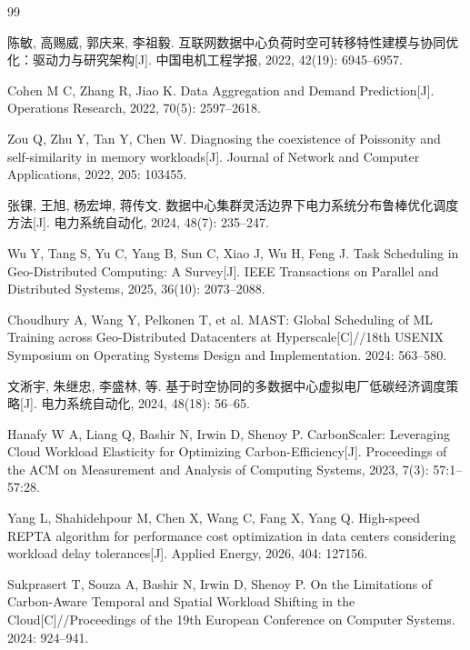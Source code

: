 \begingroup
\footnotesize
\setlength{\parskip}{0pt}
\begin{thebibliography}{99}
\setlength{\itemsep}{0.12ex}
\setlength{\parsep}{0pt}
\setlength{\topsep}{0.2ex}

陈敏, 高赐威, 郭庆来, 李祖毅. 互联网数据中心负荷时空可转移特性建模与协同优化：驱动力与研究架构[J]. 中国电机工程学报, 2022, 42(19): 6945--6957.

Cohen M C, Zhang R, Jiao K. Data Aggregation and Demand Prediction[J]. Operations Research, 2022, 70(5): 2597--2618.

Zou Q, Zhu Y, Tan Y, Chen W. Diagnosing the coexistence of Poissonity and self-similarity in memory workloads[J]. Journal of Network and Computer Applications, 2022, 205: 103455.

张锞, 王旭, 杨宏坤, 蒋传文. 数据中心集群灵活边界下电力系统分布鲁棒优化调度方法[J]. 电力系统自动化, 2024, 48(7): 235--247.

Wu Y, Tang S, Yu C, Yang B, Sun C, Xiao J, Wu H, Feng J. Task Scheduling in Geo-Distributed Computing: A Survey[J]. IEEE Transactions on Parallel and Distributed Systems, 2025, 36(10): 2073--2088.

Choudhury A, Wang Y, Pelkonen T, et al. MAST: Global Scheduling of ML Training across Geo-Distributed Datacenters at Hyperscale[C]//18th USENIX Symposium on Operating Systems Design and Implementation. 2024: 563--580.

文淅宇, 朱继忠, 李盛林, 等. 基于时空协同的多数据中心虚拟电厂低碳经济调度策略[J]. 电力系统自动化, 2024, 48(18): 56--65.

Hanafy W A, Liang Q, Bashir N, Irwin D, Shenoy P. CarbonScaler: Leveraging Cloud Workload Elasticity for Optimizing Carbon-Efficiency[J]. Proceedings of the ACM on Measurement and Analysis of Computing Systems, 2023, 7(3): 57:1--57:28.

Yang L, Shahidehpour M, Chen X, Wang C, Fang X, Yang Q. High-speed REPTA algorithm for performance cost optimization in data centers considering workload delay tolerances[J]. Applied Energy, 2026, 404: 127156.

Sukprasert T, Souza A, Bashir N, Irwin D, Shenoy P. On the Limitations of Carbon-Aware Temporal and Spatial Workload Shifting in the Cloud[C]//Proceedings of the 19th European Conference on Computer Systems. 2024: 924--941.


\end{thebibliography}
